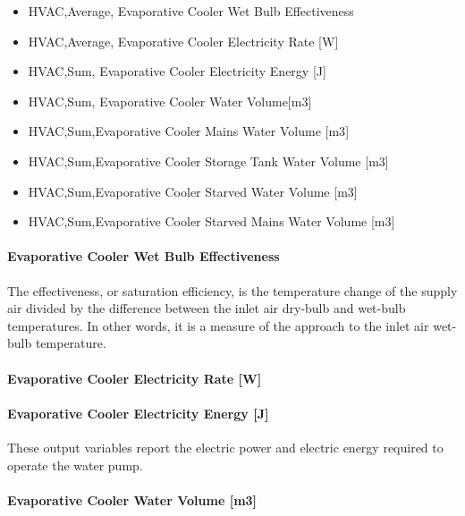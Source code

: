 \begin{itemize}
\item
  HVAC,Average, Evaporative Cooler Wet Bulb Effectiveness
\item
  HVAC,Average, Evaporative Cooler Electricity Rate {[}W{]}
\item
  HVAC,Sum, Evaporative Cooler Electricity Energy {[}J{]}
\item
  HVAC,Sum, Evaporative Cooler Water Volume{[}m3{]}
\item
  HVAC,Sum,Evaporative Cooler Mains Water Volume {[}m3{]}
\item
  HVAC,Sum,Evaporative Cooler Storage Tank Water Volume {[}m3{]}
\item
  HVAC,Sum,Evaporative Cooler Starved Water Volume {[}m3{]}
\item
  HVAC,Sum,Evaporative Cooler Starved Mains Water Volume {[}m3{]}
\end{itemize}

\paragraph{Evaporative Cooler Wet Bulb Effectiveness}\label{evaporative-cooler-wet-bulb-effectiveness}

The effectiveness, or saturation efficiency, is the temperature change of the supply air divided by the difference between the inlet air dry-bulb and wet-bulb temperatures. In other words, it is a measure of the approach to the inlet air wet-bulb temperature.

\paragraph{Evaporative Cooler Electricity Rate {[}W{]}}\label{evaporative-cooler-electric-powerw}

\paragraph{Evaporative Cooler Electricity Energy {[}J{]}}\label{evaporative-cooler-electric-energy-j}

These output variables report the electric power and electric energy required to operate the water pump.

\paragraph{Evaporative Cooler Water Volume {[}m3{]}}\label{evaporative-cooler-water-volume-m3}

